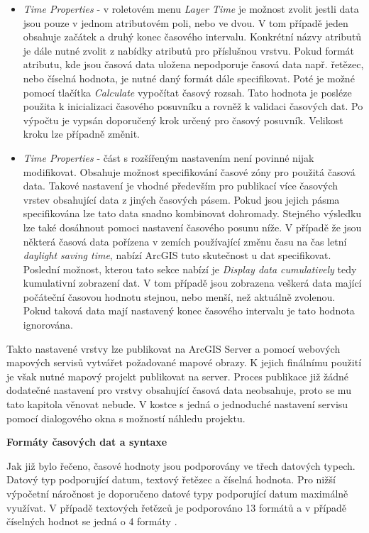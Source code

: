 \begin{itemize}
	\item \textit{Time Properties} - v roletovém menu
\textit{Layer Time} je možnost zvolit jestli data jsou pouze v jednom
atributovém poli, nebo ve dvou. V tom případě jeden obsahuje začátek a
druhý konec časového intervalu. Konkrétní názvy atributů je dále nutné
zvolit z nabídky atributů pro příslušnou vrstvu. Pokud formát
atributu, kde jsou časová data uložena nepodporuje časová data
např. řetězec, nebo číselná hodnota, je nutné daný formát dále
specifikovat. Poté je možné pomocí tlačítka \textit{Calculate}
vypočítat časový rozsah. Tato hodnota je posléze použita k
inicializaci časového posuvníku a rovněž k validaci časových dat. Po
výpočtu je vypsán doporučený krok určený pro časový posuvník. Velikost
kroku lze případně změnit.
	
	\item \textit{Time Properties} - část s rozšířeným nastavením
není povinné nijak modifikovat. Obsahuje možnost specifikování časové
zóny pro použitá časová data. Takové nastavení je vhodné především pro
publikací více časových vrstev obsahující data z jiných časových
pásem. Pokud jsou jejich pásma specifikována lze tato data snadno
kombinovat dohromady. Stejného výsledku lze také dosáhnout pomoci
nastavení časového posunu níže. V případě že jsou některá časová data
pořízena v zemích používající změnu času na čas letní \textit{daylight
saving time}, nabízí ArcGIS tuto skutečnost u dat
specifikovat. Poslední možnost, kterou tato sekce nabízí je
\textit{Display data cumulatively} tedy kumulativní zobrazení dat. V
tom případě jsou zobrazena veškerá data mající počáteční časovou
hodnotu stejnou, nebo menší, než aktuálně zvolenou. Pokud taková data
mají nastavený konec časového intervalu je tato hodnota ignorována.
\end{itemize}

Takto nastavené vrstvy lze publikovat na ArcGIS Server a pomocí
webových mapových servisů vytvářet požadované mapové obrazy. K jejich
finálnímu použití je však nutné mapový projekt publikovat na
server. Proces publikace již žádné dodatečné nastavení pro vrstvy
obsahující časová data neobsahuje, proto se mu tato kapitola věnovat
nebude. V kostce s jedná o jednoduché nastavení servisu pomocí
dialogového okna s možností náhledu projektu.

\bigskip
\noindent \textbf{Formáty časových dat a syntaxe}

Jak již bylo řečeno, časové hodnoty jsou podporovány ve třech datových
typech. Datový typ podporující datum, textový řetězec a číselná
hodnota. Pro nižší výpočetní náročnost je doporučeno datové typy
podporující datum maximálně využívat. V případě textových řetězců je
podporováno 13 formátů a v případě číselných hodnot se jedná o 4
formáty \cite{arcgiq-data-types}.  %

